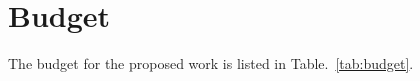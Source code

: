 \documentclass[11pt]{article}
\begin{document}

\setlength{\bibsep}{4pt plus 0.3ex}
{
  \linespread{0.2}
  \footnotesize
  
}

\newpage
\section{Budget}

The budget for the proposed work is listed in Table.~\ref{tab:budget}.


\end{document}
